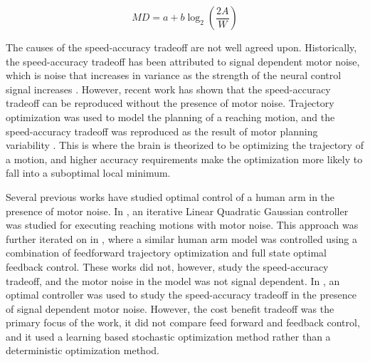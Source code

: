 \documentclass[letterpaper, 10pt, conference]{ieeeconf}
\begin{document}

\begin{equation}
    MD = a + b \log_2 \left(\frac{2A}{W}\right) \label{eq:fitts_law}
\end{equation}

The causes of the speed-accuracy tradeoff are not well agreed upon. Historically, the speed-accuracy tradeoff has been attributed to signal dependent motor noise, which is noise that increases in variance as the strength of the neural control signal increases \cite{signal_dependent_motor_noise}. 
However, recent work has shown that the speed-accuracy tradeoff can be reproduced without the presence of motor noise. Trajectory optimization was used to model the planning of a reaching motion, and the speed-accuracy tradeoff was reproduced as the result of motor planning variability \cite{original_paper_high_fidelity}. This is where the brain is theorized to be optimizing the trajectory of a motion, and higher accuracy requirements make the optimization more likely to fall into a suboptimal local minimum.

Several previous works have studied optimal control of a human arm in the presence of motor noise. In \cite{ilqg}, an iterative Linear Quadratic Gaussian controller was studied for executing reaching motions with motor noise.
This approach was further iterated on in \cite{stochastic_model}, where a similar human arm model was controlled using a combination of feedforward trajectory optimization and full state optimal feedback control. These works did not, however, study the speed-accuracy tradeoff, and the motor noise in the model was not signal dependent. In \cite{cost_benefit_tradeoff}, an optimal controller was used to study the speed-accuracy tradeoff in the presence of signal dependent motor noise. However, the cost benefit tradeoff was the primary focus of the work, it did not compare feed forward and feedback control, and it used a learning based stochastic optimization method rather than a deterministic optimization method.
\end{document}
